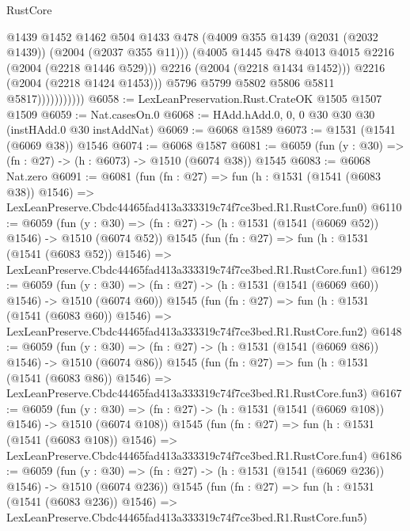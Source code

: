 \begin{lexlean}{RustCore}
\begin{coremodule}
                              @1439
                              @1452
                              @1462
                              @504
                              @1433
                              @478
                              (@4009 @355 @1439 (@2031 (@2032 @1439)) (@2004 (@2037 @355 @11)))
                              (@4005 @1445 @478 @4013 @4015 @2216 (@2004 (@2218 @1446 @529)))
                              @2216
                              (@2004 (@2218 @1434 @1452)))
                            @2216
                            (@2004 (@2218 @1424 @1453)))
                          @5796
                          @5799
                          @5802
                          @5806
                          @5811
                          @5817)))))))))))
@6058 := LexLeanPreservation.Rust.CrateOK @1505 @1507 @1509
@6059 := Nat.casesOn.{0}
@6068 := HAdd.hAdd.{0, 0, 0} @30 @30 @30 (instHAdd.{0} @30 instAddNat)
@6069 := @6068 @1589
@6073 := @1531 (@1541 (@6069 @38)) @1546
@6074 := @6068 @1587
@6081 := @6059 (fun (y : @30) => (fn : @27) -> (h : @6073) -> @1510 (@6074 @38)) @1545
@6083 := @6068 Nat.zero
@6091 := @6081
    (fun (fn : @27) =>
    fun (h : @1531 (@1541 (@6083 @38)) @1546) =>
    LexLeanPreserve.Cbdc44465fad413a333319c74f7ce3bed.R1.RustCore.fun0)
@6110 := @6059
    (fun (y : @30) => (fn : @27) -> (h : @1531 (@1541 (@6069 @52)) @1546) -> @1510 (@6074 @52))
    @1545
    (fun (fn : @27) =>
    fun (h : @1531 (@1541 (@6083 @52)) @1546) =>
    LexLeanPreserve.Cbdc44465fad413a333319c74f7ce3bed.R1.RustCore.fun1)
@6129 := @6059
    (fun (y : @30) => (fn : @27) -> (h : @1531 (@1541 (@6069 @60)) @1546) -> @1510 (@6074 @60))
    @1545
    (fun (fn : @27) =>
    fun (h : @1531 (@1541 (@6083 @60)) @1546) =>
    LexLeanPreserve.Cbdc44465fad413a333319c74f7ce3bed.R1.RustCore.fun2)
@6148 := @6059
    (fun (y : @30) => (fn : @27) -> (h : @1531 (@1541 (@6069 @86)) @1546) -> @1510 (@6074 @86))
    @1545
    (fun (fn : @27) =>
    fun (h : @1531 (@1541 (@6083 @86)) @1546) =>
    LexLeanPreserve.Cbdc44465fad413a333319c74f7ce3bed.R1.RustCore.fun3)
@6167 := @6059
    (fun (y : @30) => (fn : @27) -> (h : @1531 (@1541 (@6069 @108)) @1546) -> @1510 (@6074 @108))
    @1545
    (fun (fn : @27) =>
    fun (h : @1531 (@1541 (@6083 @108)) @1546) =>
    LexLeanPreserve.Cbdc44465fad413a333319c74f7ce3bed.R1.RustCore.fun4)
@6186 := @6059
    (fun (y : @30) => (fn : @27) -> (h : @1531 (@1541 (@6069 @236)) @1546) -> @1510 (@6074 @236))
    @1545
    (fun (fn : @27) =>
    fun (h : @1531 (@1541 (@6083 @236)) @1546) =>
    LexLeanPreserve.Cbdc44465fad413a333319c74f7ce3bed.R1.RustCore.fun5)

\end{coremodule}
\end{lexlean}
